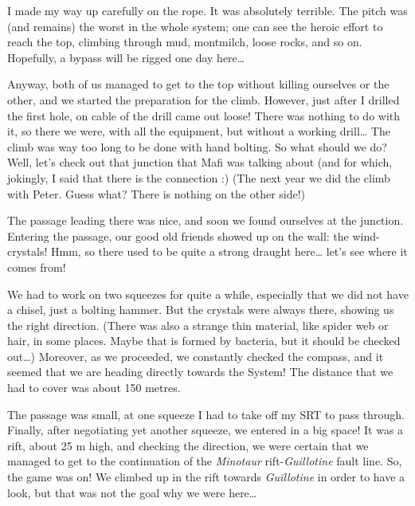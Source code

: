 I made my way up carefully on the rope. It was absolutely terrible. The
pitch was (and remains) the worst in the whole system; one can see the
heroic effort to reach the top, climbing through mud, montmilch, loose
rocks, and so on. Hopefully, a bypass will be rigged one day
here\ldots{}

Anyway, both of us managed to get to the top without killing ourselves
or the other, and we started the preparation for the climb. However,
just after I drilled the first hole, on cable of the drill came out
loose! There was nothing to do with it, so there we were, with all the
equipment, but without a working drill\ldots{} The climb was way too
long to be done with hand bolting. So what should we do? Well, let's
check out that junction that Mafi was talking about (and for which,
jokingly, I said that there is the connection :) (The next year we did
the climb with Peter. Guess what? There is nothing on the other side!)

The passage leading there was nice, and soon we found ourselves at the
junction. Entering the passage, our good old friends showed up on the
wall: the wind-crystals! Hmm, so there used to be quite a strong draught
here\ldots{} let's see where it comes from!

We had to work on two squeezes for quite a while, especially that we did
not have a chisel, just a bolting hammer. But the crystals were always
there, showing us the right direction. (There was also a strange thin
material, like spider web or hair, in some places. Maybe that is formed
by bacteria, but it should be checked out\ldots{}) Moreover, as we
proceeded, we constantly checked the compass, and it seemed that we are
heading directly towards the System! The distance that we had to cover
was about 150 metres.

The passage was small, at one squeeze I had to take off my SRT to pass
through. Finally, after negotiating yet another squeeze, we entered in a
big space! It was a rift, about 25 m high, and checking the direction,
we were certain that we managed to get to the continuation of the
\emph{Minotaur} rift-\emph{Guillotine} fault line. So, the game was on!
We climbed up in the rift towards \emph{Guillotine} in order to have a
look, but that was not the goal why we were here\ldots{}

